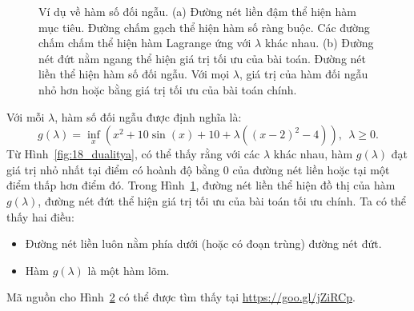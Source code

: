 \begin{figure}[t]
\begin{subfigure}{0.48\textwidth}
\caption{}
\label{fig:18_dualityb}
\end{subfigure}
\caption{Ví dụ về hàm số đối ngẫu. (a) Đường nét liền đậm thể hiện hàm mục
tiêu. Đường chấm gạch thể hiện hàm số ràng buộc. Các đường chấm chấm
thể hiện hàm Lagrange ứng với $\lambda$ khác nhau. (b)
Đường nét đứt nằm ngang thể hiện giá trị tối ưu của bài toán. Đường nét liền thể
hiện hàm số đối ngẫu. Với mọi $\lambda$, giá trị của hàm đối ngẫu nhỏ
hơn hoặc bằng giá trị tối ưu của bài toán chính.}
\label{fig:18_duality}
\end{figure}

Với mỗi $\lambda$, hàm số đối ngẫu được định nghĩa là:
\begin{equation*}
g(\lambda) = \inf_{x} \left(x^2 + 10\sin(x) + 10+ \lambda((x-2)^2 - 4) \right), ~~ \lambda \geq 0.
\end{equation*}
Từ Hình~\ref{fig:18_dualitya}, có thể thấy rằng với các $\lambda$ khác
nhau, hàm $g(\lambda)$ đạt giá trị nhỏ nhất tại điểm có hoành độ bằng 0 của
đường nét liền hoặc tại một điểm thấp hơn điểm đó. Trong Hình~\ref{fig:18_dualityb}, đường nét liền thể hiện đồ thị của hàm $g(\lambda)$, đường nét đứt thể hiện
giá trị tối ưu của bài toán tối ưu chính. Ta có thể thấy hai
điều:
\begin{itemize}
\item Đường nét liền luôn nằm phía dưới (hoặc có đoạn trùng) đường nét
đứt.

\item Hàm $g(\lambda)$ là một hàm lõm.
\end{itemize}

Mã nguồn cho Hình~\ref{fig:18_duality} có thể được tìm thấy tại
\url{https://goo.gl/jZiRCp}.

